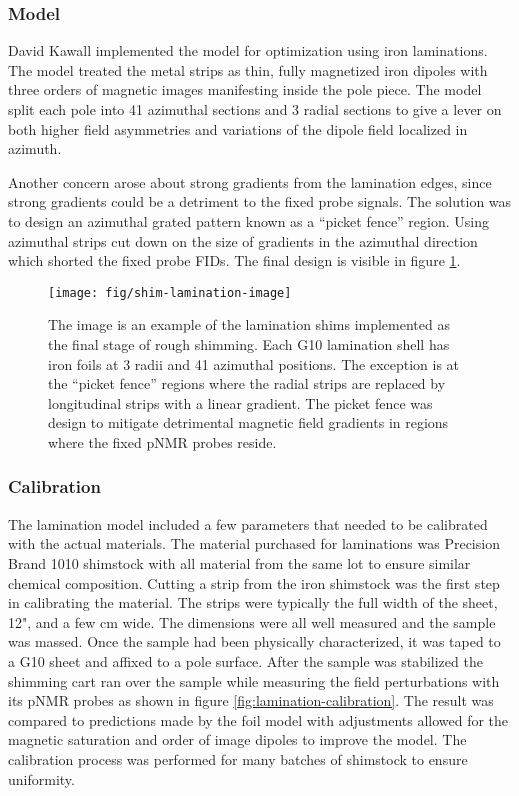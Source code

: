 \subsubsection{Model}

David Kawall implemented the model for optimization using iron laminations.  The model treated the metal strips as thin, fully magnetized iron dipoles with three orders of magnetic images manifesting inside the pole piece.  The model split each pole into 41 azimuthal sections and 3 radial sections to give a lever on both higher field asymmetries and variations of the dipole field localized in azimuth.  

Another concern arose about strong gradients from the lamination edges, since strong gradients could be a detriment to the fixed probe signals.  The solution was to design an azimuthal grated pattern known as a ``picket fence'' region.  Using azimuthal strips cut down on the size of gradients in the azimuthal direction which shorted the fixed probe FIDs. The final design is visible in figure \ref{fig:shim-lamination-image}.

\begin{figure}
\centering
\texttt{[image: fig/shim-lamination-image]}
\caption{
    The image is an example of the lamination shims implemented as the final stage of rough shimming.  Each G10 lamination shell has iron foils at 3 radii and 41 azimuthal positions.  The exception is at the ``picket fence'' regions where the radial strips are replaced by longitudinal strips with a linear gradient.  The picket fence was design to mitigate detrimental magnetic field gradients in regions where the fixed pNMR probes reside.
    \label{fig:shim-lamination-image}
}
\end{figure}

\subsubsection{Calibration}

The lamination model included a few parameters that needed to be calibrated with the actual materials.  The material purchased for laminations was Precision Brand 1010 shimstock with all material from the same lot to ensure similar chemical composition.  Cutting a strip from the iron shimstock was the first step in calibrating the material.  The strips were typically the full width of the sheet, 12", and a few \si{\centi\meter} wide.  The dimensions were all well measured and the sample was massed.  Once the sample had been physically characterized, it was taped to a G10 sheet and affixed to a pole surface.  After the sample was stabilized the shimming cart ran over the sample while measuring the field perturbations with its pNMR probes as shown in figure \ref{fig:lamination-calibration}.  The result was compared to predictions made by the foil model with adjustments allowed for the magnetic saturation and order of image dipoles to improve the model.  The calibration process was performed for many batches of shimstock to ensure uniformity.


